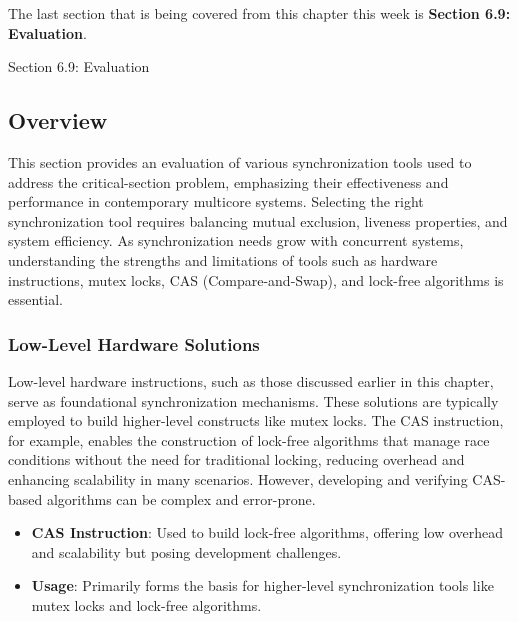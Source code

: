 The last section that is being covered from this chapter this week is \textbf{Section 6.9: Evaluation}.

\begin{notes}{Section 6.9: Evaluation}
    \subsection*{Overview}

    This section provides an evaluation of various synchronization tools used to address the critical-section problem, emphasizing their effectiveness and performance in contemporary multicore systems. 
    Selecting the right synchronization tool requires balancing mutual exclusion, liveness properties, and system efficiency. As synchronization needs grow with concurrent systems, understanding the 
    strengths and limitations of tools such as hardware instructions, mutex locks, CAS (Compare-and-Swap), and lock-free algorithms is essential.
    
    \subsubsection*{Low-Level Hardware Solutions}
    
    Low-level hardware instructions, such as those discussed earlier in this chapter, serve as foundational synchronization mechanisms. These solutions are typically employed to build higher-level 
    constructs like mutex locks. The CAS instruction, for example, enables the construction of lock-free algorithms that manage race conditions without the need for traditional locking, reducing 
    overhead and enhancing scalability in many scenarios. However, developing and verifying CAS-based algorithms can be complex and error-prone.
    
    \begin{highlight}
    
        \begin{itemize}
            \item \textbf{CAS Instruction}: Used to build lock-free algorithms, offering low overhead and scalability but posing development challenges.
            \item \textbf{Usage}: Primarily forms the basis for higher-level synchronization tools like mutex locks and lock-free algorithms.
        \end{itemize}
    
    \end{highlight}
    

\end{notes}
